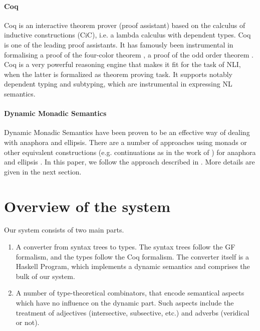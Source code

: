 \documentclass[11pt]{article}
\begin{document}
\paragraph{Coq}
Coq is an interactive theorem prover (proof assistant) based on the
calculus of inductive constructions (CiC), i.e.  a lambda calculus
with dependent types. Coq is one of the leading proof assistants. It
has famously been instrumental in formalising a proof of the
four-color theorem \citep{Gonthier:2008}, a proof of the odd order
theorem \citep{Gonthier:2013}. Coq is a very powerful reasoning engine
that makes it fit for the task of NLI, when the latter is formalized
as theorem proving task. It supports
notably dependent typing and subtyping, which are instrumental in
expressing NL semantics.

\paragraph{Dynamic Monadic Semantics}
Dynamic Monadic Semantics have been proven to be an effective way of
dealing with anaphora and ellipsis. There are a number of approaches
using monads or other equivalent constructions (e.g. continuations as in the work of
\citet{de2006}) for anaphora and ellipsis
\citet{Shan:2002,unger:2011,Barker:04,de2016,charlow:2017}. In this
paper, we follow the approach described in
\citet{bernardy_jolli}. More details are given in the next
section.



\section{Overview of the system}

Our system consists of two main parts.
\begin{enumerate}[noitemsep]
\item A converter from syntax trees to types. The syntax trees follow
  the GF formalism, and the types follow the Coq formalism. The
  converter itself is a Haskell Program, which implements a dynamic
  semantics and comprises the bulk of our system.
\item A number of type-theoretical combinators, that encode semantical
  aspects which have no influence on the dynamic part. Such aspects
  include the treatment of adjectives (intersective, subsective, etc.)
  and adverbs (veridical or not).
\end{enumerate}

\end{document}

